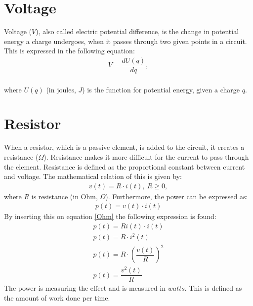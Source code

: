 \section{Voltage}
Voltage ($V$), also called electric potential difference, is the change in potential energy a charge undergoes, when it passes through two given points in a circuit. This is expressed in the following equation:
\begin{align}
	V=\dfrac{dU(q)}{dq},
\end{align}
\\
where $U(q)$ (in joules, $J$) is the function for potential energy, given a charge $q$.

\section{Resistor}
When a resistor, which is a passive element, is added to the circuit, it creates a resistance ($\Omega$). Resistance makes it more difficult for the current to pass through the element. Resistance is defined as the proportional constant between current and voltage. The mathematical relation of this is given by:
\begin{align} 
\label{Ohm}
v(t)=R\cdot i(t),\ R\geq0,
\end{align}
where $R$ is resistance (in Ohm, $\Omega$). Furthermore, the power can be expressed as: \cite[p. 25]{bcircuit} 
\begin{align} 
\label{power}
p(t)=v(t)\cdot i(t)
\end{align}
By inserting this on equation \ref{Ohm} the following expression is found:
\begin{align}
p(t)=Ri(t)\cdot i(t) \\
p(t)=R \cdot i^2(t) \\
p(t)=R \cdot \left(\dfrac{v(t)}{R} \right)^2 \\
p(t)=\dfrac{v^2(t)}{R} \label{resistor:power}
\end{align}
The power is measuring the effect and is measured in $watts$. This is defined as the amount of work done per time. 
